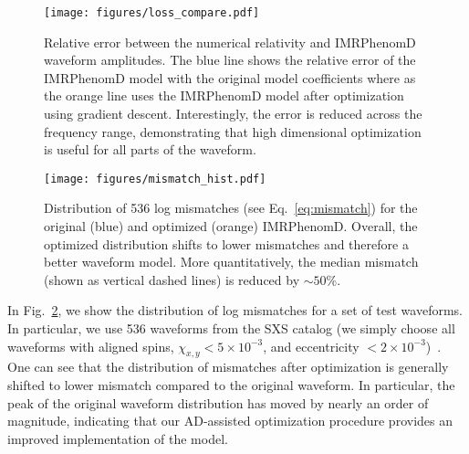\documentclass[twocolumn]{aastex631}
\newcommand{\te}[1]{\textbf{\color{pyGreen}(TE: #1)}}
\newcommand{\AZ}[1]{{\color{Burnt}[AZ: #1]}}
\begin{document}

\begin{figure}[t]
	\begin{centering}
		\texttt{[image: figures/loss\_compare.pdf]}
		\caption{
			Relative error between the numerical relativity and IMRPhenomD waveform amplitudes. 
            The blue line shows the relative error of the IMRPhenomD model with the original model coefficients where as the orange line uses the IMRPhenomD model after optimization using gradient descent.
            Interestingly, the error is reduced across the frequency range, demonstrating that high dimensional optimization is useful for all parts of the waveform.
        }
		\label{fig:loss_compare}
	\end{centering}
\end{figure}

\begin{figure}[t]
	\begin{centering}
		\texttt{[image: figures/mismatch\_hist.pdf]}
		\caption{
			Distribution of 536 log mismatches (see Eq.~\ref{eq:mismatch}) for the original (blue) and optimized (orange) IMRPhenomD. 
            Overall, the optimized distribution shifts to lower mismatches and therefore a better waveform model. 
            More quantitatively, the median mismatch (shown as vertical dashed lines) is reduced by $\sim50$\%. 
		}
		\label{fig:mismatch_hist}
	\end{centering}
\end{figure}
 
In Fig.~\ref{fig:mismatch_hist}, we show the distribution of log mismatches for a set of test waveforms.
In particular, we use 536 waveforms from the SXS catalog (we simply choose all waveforms with aligned spins, $\chi_{x,y}<5\times 10^{-3}$, and eccentricity $<2\times 10^{-3}$)~\citep{Boyle:2019kee}.
One can see that the distribution of mismatches after optimization is generally shifted to lower mismatch compared to the original waveform.
In particular, the peak of the original waveform distribution has moved by nearly an order of magnitude, indicating that our AD-assisted optimization procedure provides an improved implementation of the model.
\end{document}
